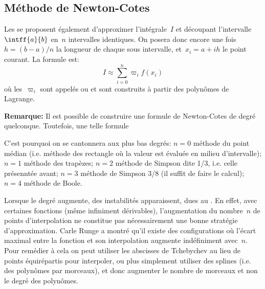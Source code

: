 \medskip
\subsection*{Méthode de Newton-Cotes}

Les  se proposent également d'approximer
l'intégrale~$I$ et découpant l'intervalle~$\intff{a}{b}$ en~$n$ intervalles identiques.
On posera donc encore une fois~$h=(b-a)/n$ la longueur de chaque sous intervalle, 
et~$x_i=a+ih$ le point courant.
La formule est:
\begin{equation} I\approx \sum_{i=0}^n \varpi_i f(x_i) \end{equation}
où les~$\varpi_i$ sont appelés  ou  et sont construits à partir des polynômes de Lagrange.

\medskip
{}

\medskip
\textbf{Remarque:}
Il est possible de construire une formule de Newton-Cotes de degré quelconque.
Toutefois, une telle formule 

C'est pourquoi on se cantonnera aux plus bas degrés:
$n=0$ méthode du point médian (i.e. méthode des rectangle où la valeur est
évaluée en milieu d'intervalle); 
$n=1$ méthode des trapèzes;
$n=2$ méthode de Simpson dite 1/3, i.e. celle présenntée avant;
$n=3$ méthode de Simpson 3/8 (il suffit de faire le calcul);
$n=4$ méthode de Boole.

Lorsque le degré augmente, des instabilités apparaissent, dues au
.
En effet, avec certaines fonctions (même infiniment dérivables), l'augmentation 
du nombre~$n$ de points d'interpolation ne constitue pas nécessairement une bonne 
stratégie d'approximation.
Carle Runge a montré qu'il existe des configurations où l'écart maximal entre la fonction 
et son interpolation augmente indéfiniment avec~$n$.
Pour remédier à cela on peut utiliser les abscisses de Tchebychev 
au lieu de points équirépartis pour interpoler, ou plus simplement utiliser des splines (i.e. des polynômes 
par morceaux), et donc augmenter le nombre de morceaux et non le degré des polynômes.








